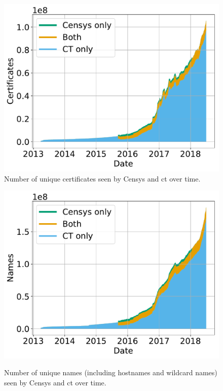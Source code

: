 \begin{figure}
  \centering
  \includegraphics[width=\linewidth]{fig/cert_count_valid}
  \caption{Number of unique certificates seen by Censys and \ac{ct} over time.}
  \label{fig:count:certs}
\end{figure}

\begin{figure}
  \centering
  \includegraphics[width=\linewidth]{fig/name_count_valid}
  \label{fig:count:names}
  \caption{Number of unique names (including hostnames and wildcard names) seen
  by Censys and \ac{ct} over time.}
  \label{fig:count}
\end{figure}

